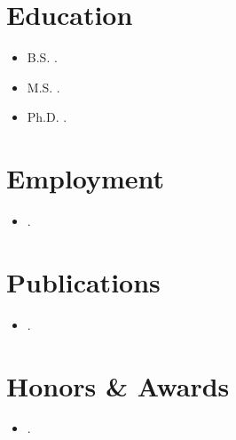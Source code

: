\begin{singlespace}
\section*{\textbf{Education}}
\begin{itemize}
  \item B.S. .
  \item M.S. .
  \item Ph.D. .
\end{itemize}

\section*{\textbf{Employment}}
\begin{itemize}
\item .
\end{itemize}

\section*{\textbf{Publications}}
\begin{itemize}
\item .
\end{itemize}

\section*{\textbf{Honors \& Awards}}
\begin{itemize}
\item .
\end{itemize}

\end{singlespace}